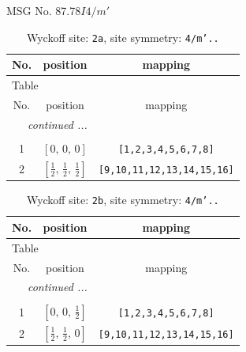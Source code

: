 \documentclass[fleqn,8pt]{jsarticle}
\begin{document}
\setcounter{MaxMatrixCols}{32}

\renewcommand{\tablename}{Table~}
\renewcommand{\figurename}{Figure~}
\begin{center}
\LARGE
MSG No. 87.78\quad$I4/m'$
\end{center}
\renewcommand{\arraystretch}{1.2}
\begin{longtable}{ccc}
\caption{Wyckoff site: {\tt 2a}, site symmetry: {\tt 4/m'..}}
 \\
 \hline \hline
No. & position & mapping \\ \hline \endfirsthead

\multicolumn{2}{l}{\tablename\ \thetable{}} \\
 \hline \hline
No. & position & mapping \\ \hline \endhead

 \hline \hline
\multicolumn{2}{r}{\footnotesize\it continued ...} \\ \endfoot

 \hline \hline
\multicolumn{2}{r}{} \\ \endlastfoot

1 & $\left[ 0,\, 0,\, 0 \right]$ & {\tt [1,2,3,4,5,6,7,8]} \\ \hline
2 & $\left[ \frac{1}{2},\, \frac{1}{2},\, \frac{1}{2} \right]$ & {\tt [9,10,11,12,13,14,15,16]} \\
\end{longtable}
\renewcommand{\arraystretch}{1.2}
\begin{longtable}{ccc}
\caption{Wyckoff site: {\tt 2b}, site symmetry: {\tt 4/m'..}}
 \\
 \hline \hline
No. & position & mapping \\ \hline \endfirsthead

\multicolumn{2}{l}{\tablename\ \thetable{}} \\
 \hline \hline
No. & position & mapping \\ \hline \endhead

 \hline \hline
\multicolumn{2}{r}{\footnotesize\it continued ...} \\ \endfoot

 \hline \hline
\multicolumn{2}{r}{} \\ \endlastfoot

1 & $\left[ 0,\, 0,\, \frac{1}{2} \right]$ & {\tt [1,2,3,4,5,6,7,8]} \\ \hline
2 & $\left[ \frac{1}{2},\, \frac{1}{2},\, 0 \right]$ & {\tt [9,10,11,12,13,14,15,16]} \\
\end{longtable}
\end{document}

